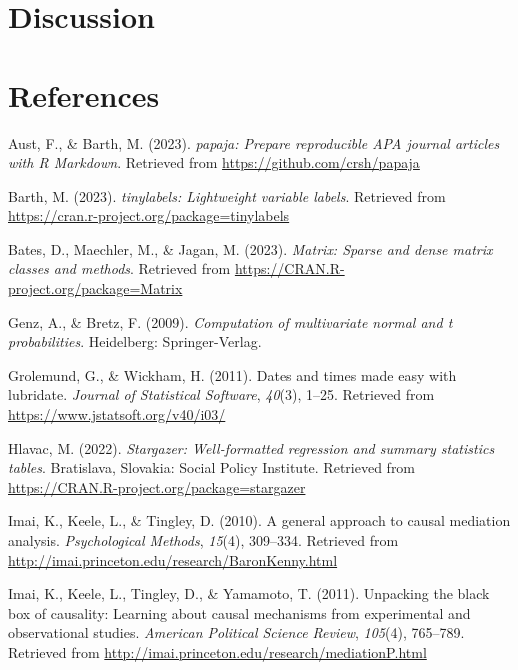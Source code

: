 \documentclass[
  man,floatsintext]{apa6}
\newlength{\cslhangindent}
\newlength{\cslentryspacingunit} %
\newenvironment{CSLReferences}[2] %
 {%
  \setlength{\parindent}{0pt}
  \ifodd #1
  \let\oldpar\par
  \def\par{\hangindent=\cslhangindent\oldpar}
  \fi
  \setlength{\parskip}{#2\cslentryspacingunit}
 }%
 {}
\begin{document}
\hypertarget{discussion}{%
\section{Discussion}\label{discussion}}

\newpage

\hypertarget{references}{%
\section{References}\label{references}}

\hypertarget{refs}{}
\begin{CSLReferences}{1}{0}
\leavevmode{}%
Aust, F., \& Barth, M. (2023). \emph{{papaja}: {Prepare} reproducible {APA} journal articles with {R Markdown}}. Retrieved from \url{https://github.com/crsh/papaja}

\leavevmode{}%
Barth, M. (2023). \emph{{tinylabels}: Lightweight variable labels}. Retrieved from \url{https://cran.r-project.org/package=tinylabels}

\leavevmode{}%
Bates, D., Maechler, M., \& Jagan, M. (2023). \emph{Matrix: Sparse and dense matrix classes and methods}. Retrieved from \url{https://CRAN.R-project.org/package=Matrix}

\leavevmode{}%
Genz, A., \& Bretz, F. (2009). \emph{Computation of multivariate normal and t probabilities}. Heidelberg: Springer-Verlag.

\leavevmode{}%
Grolemund, G., \& Wickham, H. (2011). Dates and times made easy with {lubridate}. \emph{Journal of Statistical Software}, \emph{40}(3), 1--25. Retrieved from \url{https://www.jstatsoft.org/v40/i03/}

\leavevmode{}%
Hlavac, M. (2022). \emph{Stargazer: Well-formatted regression and summary statistics tables}. Bratislava, Slovakia: Social Policy Institute. Retrieved from \url{https://CRAN.R-project.org/package=stargazer}

\leavevmode{}%
Imai, K., Keele, L., \& Tingley, D. (2010). A general approach to causal mediation analysis. \emph{Psychological Methods}, \emph{15}(4), 309--334. Retrieved from \url{http://imai.princeton.edu/research/BaronKenny.html}

\leavevmode{}%
Imai, K., Keele, L., Tingley, D., \& Yamamoto, T. (2011). Unpacking the black box of causality: Learning about causal mechanisms from experimental and observational studies. \emph{American Political Science Review}, \emph{105}(4), 765--789. Retrieved from \url{http://imai.princeton.edu/research/mediationP.html}


\end{CSLReferences}
\end{document}
